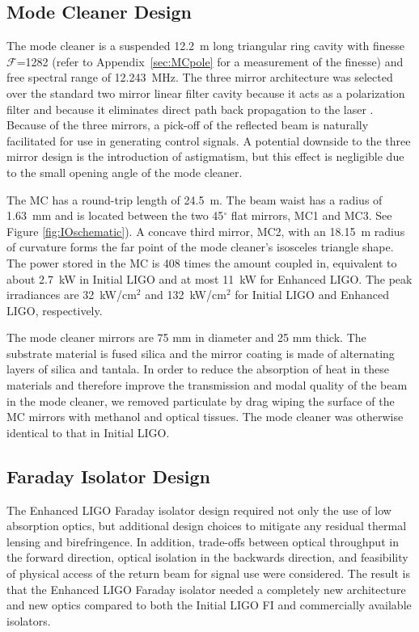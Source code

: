 \subsection{Mode Cleaner Design}
The mode cleaner is a suspended 12.2~m long triangular ring cavity
with finesse $\mathcal{F}$=1282 (refer to Appendix~\ref{sec:MCpole}
for a measurement of the finesse) and free spectral range of
12.243~MHz. The three mirror architecture was selected over the
standard two mirror linear filter cavity because it acts as a
polarization filter and because it eliminates direct path back
propagation to the laser \citep{Raab1992Estimation}. Because of the
three mirrors, a pick-off of the reflected beam is naturally
facilitated for use in generating control signals. A potential
downside to the three mirror design is the introduction of
astigmatism, but this effect is negligible due to the small opening
angle of the mode cleaner.

The MC has a round-trip length of 24.5~m. The beam waist has a radius of
1.63~mm and is located between the two 45$^\circ$ flat mirrors, MC1 and
MC3. See Figure \ref{fig:IOschematic}). A concave third mirror, MC2,
with an 18.15~m radius of curvature forms the far point of the mode
cleaner's isosceles triangle shape. The power stored in the MC is 408
times the amount coupled in, equivalent to about 2.7~kW in Initial
LIGO and at most 11~kW for Enhanced LIGO. The peak irradiances are
32~kW/cm$^2$ and 132~kW/cm$^2$ for Initial LIGO and Enhanced LIGO,
respectively.

The mode cleaner mirrors are 75 mm in diameter and 25 mm thick. The
substrate material is fused silica and the mirror coating is made of
alternating layers of silica and tantala. In order to reduce the
absorption of heat in these materials and therefore improve the
transmission and modal quality of the beam in the mode cleaner, we
removed particulate by drag wiping the surface of the MC mirrors with
methanol and optical tissues. The mode cleaner was otherwise identical
to that in Initial LIGO.



\subsection{Faraday Isolator Design}
The Enhanced LIGO Faraday isolator design required not only the use of
low absorption optics, but additional design choices to mitigate any
residual thermal lensing and birefringence. In addition, trade-offs
between optical throughput in the forward direction, optical isolation
in the backwards direction, and feasibility of physical access of the
return beam for signal use were considered. The result is that the
Enhanced LIGO Faraday isolator needed a completely new architecture
and new optics compared to both the Initial LIGO FI and commercially
available isolators.

